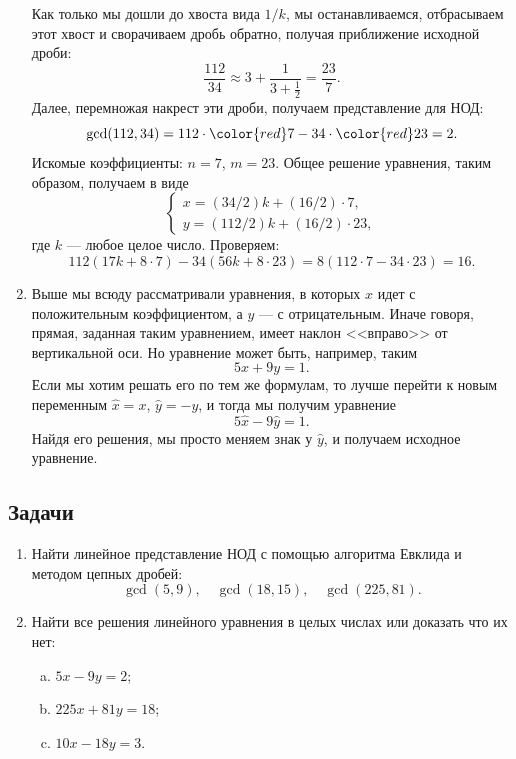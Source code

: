 \begin{enumerate}
Как только мы дошли до хвоста вида $1/k$, мы останавливаемся, отбрасываем этот хвост и сворачиваем дробь обратно, получая приближение исходной дроби:
$$
\frac{112}{34} \approx 3 + \frac{1}{3 + \frac{1}{2}} = \frac{23}{7}.
$$
Далее, перемножая накрест эти дроби, получаем представление для НОД:
$$
\gcd(112,34) = 112\cdot {\color{red}7} - 34\cdot {\color{red}23} = 2.
$$
Искомые коэффициенты: $n=7$, $m=23$. Общее решение уравнения, таким образом, получаем в виде
$$
\begin{cases}
x  = (34/2)k +  (16/2)\cdot 7, \\
y  = (112/2)k + (16/2)\cdot 23 ,
\end{cases}
$$
где $k$ --- любое целое число. Проверяем:
$$
112(17k +  8\cdot 7)-34(56k + 8\cdot 23) = 8(112\cdot 7- 34\cdot 23) = 16.
$$
\item Выше мы всюду рассматривали уравнения, в которых $x$ идет с положительным коэффициентом, а $y$ --- с отрицательным. Иначе говоря, прямая, заданная таким уравнением, имеет наклон <<вправо>> от вертикальной оси. Но уравнение может быть, например, таким
$$
5x+9y=1.
$$
Если мы хотим решать его по тем же формулам, то лучше перейти к новым переменным $\hat x=x$, $\hat y=-y$, и тогда мы получим уравнение
$$
5\hat x-9\hat y=1.
$$
Найдя его решения, мы просто меняем знак у $\hat y$, и получаем исходное уравнение.
\end{enumerate}

\subsection*{Задачи}

\begin{enumerate}
\item Найти линейное представление НОД с помощью алгоритма Евклида и методом цепных дробей:
$$
\gcd(5,9),\quad \gcd(18,15),\quad \gcd(225,81).
$$
\item Найти все решения линейного уравнения в целых числах или доказать что их нет:
\begin{enumerate}[a)]
\item $5x-9y=2$;
\item $225x+81y=18$;
\item $10x-18y=3$.
\end{enumerate}
\end{enumerate}

\label{Fields}

